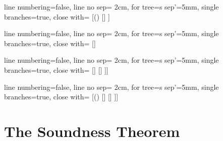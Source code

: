 \begin{enumerate}[\thesection.1]
\begin{center}
					\vspace{2ex}

					\begin{prooftree}
					{
					line numbering=false,
					line no sep= 2cm,
					for tree={s sep'=5mm},
					single branches=true,
					close with=\xmark
					}
					[\neg (\phi\to\psi) [\phi [\neg \psi ] ] ]
					\end{prooftree}
					\begin{prooftree}
					{
					line numbering=false,
					line no sep= 2cm,
					for tree={s sep'=5mm},
					single branches=true,
					close with=\xmark
					}
					[\phi\to\psi [\neg \phi ] [\psi ] ]
					\end{prooftree}
					\begin{prooftree}
					{
					line numbering=false,
					line no sep= 2cm,
					for tree={s sep'=5mm},
					single branches=true,
					close with=\xmark
					}
					[\phi\leftrightarrow \psi [\phi [\psi] ] [\neg \phi [\neg \psi] ] ]]
					\end{prooftree}
					\begin{prooftree}
					{
					line numbering=false,
					line no sep= 2cm,
					for tree={s sep'=5mm},
					single branches=true,
					close with=\xmark
					}
					[\neg(\phi\leftrightarrow \psi) [\phi [\neg \psi] ] [\neg \phi [ \psi] ] ]]
					\end{prooftree}

				\end{center}
		

\end{enumerate}	

\section{The Soundness Theorem}

